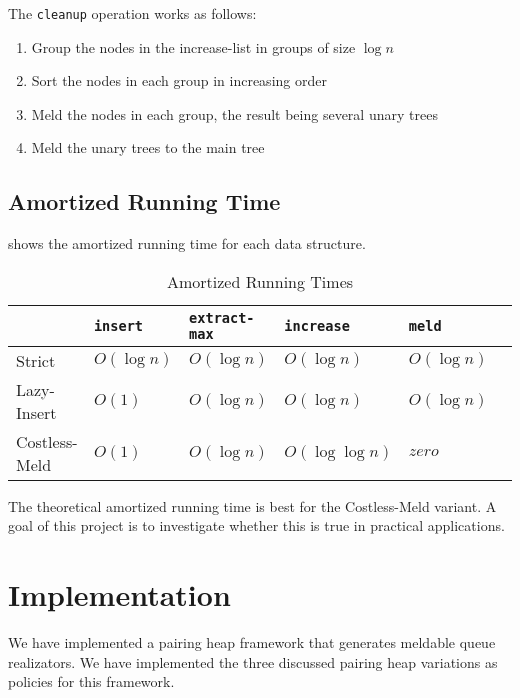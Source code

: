\documentclass{DIKU-article}[2010/01/13]
\newcommand{\code}[1]{{\small\texttt{#1}}}
\begin{document}
\begin{description}
  The \code{cleanup} operation works as follows:
  \begin{enumerate}
  \item Group the nodes in the increase-list in groups of size $\log
    n$
  \item Sort the nodes in each group in increasing order
  \item Meld the nodes in each group, the result being several unary
    trees
  \item Meld the unary trees to the main tree
  \end{enumerate}

\end{description}

\subsection{Amortized Running Time}
 shows the amortized running time for each
data structure.
\begin{table}[h]
\label{tab:running_time}
\caption{Amortized Running Times}
\begin{tabular}{l|lllll}
 & \code{insert} & \code{extract-max}  &
 \code{increase} & \code{meld} \\ \hline
Strict & $O(\log n)$ & $O(\log n)$ & $O(\log n)$ & $O(\log n)$ \\
Lazy-Insert & $O(1)$ & $O(\log n)$ & $O(\log n)$ & $O(\log n)$ \\
Costless-Meld & $O(1)$ & $O(\log n)$ & $O(\log \log n)$ & $zero$ \\
\end{tabular}
\end{table}

The theoretical amortized running time is best for the Costless-Meld
variant. A goal of this project is to investigate whether this is true
in practical applications.

\section{Implementation}

We have implemented a pairing heap framework that generates meldable
queue realizators. We have implemented the three discussed pairing
heap variations as policies for this framework.
\end{document}
